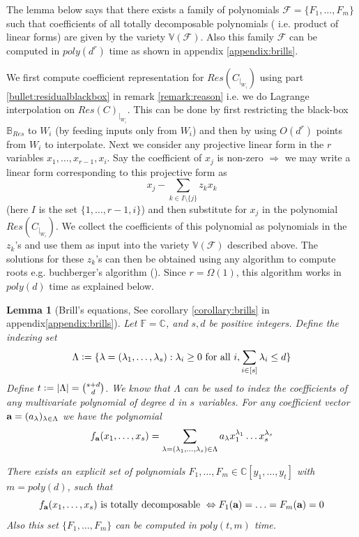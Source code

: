 \documentclass[12pt]{caltech_thesis}
\theoremstyle{plain}
\newtheorem{lemma}{Lemma}
\theoremstyle{definition}
\newcommand{\defeq}{\vcentcolon=}
\renewcommand{\bf}{\textbf}
\newcommand{\F}{\mathbb{F}}
\newcommand{\MF}{\mathcal{F}}
\newcommand{\CB}{\mathbb{B}}
\newcommand{\C}{\mathbb{C}}
\newcommand{\V}{\mathbb{V}}
\begin{document}
The lemma below says that
there exists a family of polynomials $\MF = \{F_1,\ldots,F_m\}$ such that coefficients of all totally decomposable polynomials 
( i.e. product of linear forms)
are given by the variety $\V(\MF)$. Also this family $\MF$ can be computed in $poly(d^r)$ time as shown in appendix \ref{appendix:brills}.

We first compute coefficient representation for $Res(C_{|_{W_i}})$ using part \ref{bullet:residualblackbox} in remark 
\ref{remark:reason} i.e. we do Lagrange interpolation on $Res(C)_{|_{W_i}}$. This can be done by first restricting
the black-box $\CB_{Res}$ to $W_i$ (by feeding inputs only from $W_i$) and then by using $O(d^r)$ points from $W_i$ to
interpolate. Next we consider any   projective linear form in the $r$ variables $x_1,\ldots,x_{r-1},x_i$. Say the coefficient of $x_j$
is non-zero $\Rightarrow$ we may write a linear form corresponding to this projective form  as 
\[x_j -\sum\limits_{k\in I\setminus \{j\}}z_kx_k\] (here $I$ is the set $\{1,\ldots,r-1,i\}$)
and then substitute for $x_j$ in the polynomial $Res(C_{|_{W_i}})$. We collect the coefficients of this polynomial 
as polynomials in the $z_k$'s and use them as input into the variety $\V(\MF)$ described above. The solutions for these
$z_k$'s can then be obtained using any algorithm to compute roots e.g. buchberger's algorithm (\cite{Buc76}). Since $r = \Omega(1)$,
this algorithm works in $poly(d)$ time as explained below.

\begin{lemma}[Brill's equations, See corollary \ref{corollary:brills} in appendix\ref{appendix:brills}]\label{lemma:brills}
 Let $\F=\C$, and $s,d$ be positive integers.
 Define the indexing set
\[
 \Lambda\defeq \{\lambda = (\lambda_1,\ldots,\lambda_s) : \lambda_i\geq 0 \text{ for all } i,
 \sum\limits_{i\in[s]}\lambda_i\leq d\}
 \]
 Define $ t \defeq |\Lambda| = {s+d\choose d}$. We know that $\Lambda$ can be used to index the coefficients of any multivariate polynomial of degree
 $d$ in $s$ variables. For any coefficient vector ${\bf a }= (a_\lambda)_{\lambda\in \Lambda}$ we have the polynomial
 \[
 f_{\bf a}(x_1,\ldots,x_s) = \sum\limits_{\lambda=(\lambda_1,\ldots,\lambda_s) \in \Lambda}a_{\lambda}x_1^{\lambda_1}\ldots x_s^{\lambda_s}
 \]

There exists an explicit set of polynomials $F_1,\ldots,F_m \in \C[y_1,\ldots,y_t]$ with $m=poly(d)$, such that
\[
f_{\bf a}(x_1,\ldots,x_s) \text{ is totally decomposable } \Leftrightarrow F_1(\bf a) = \ldots = F_m(\bf a)=0
\]
Also this set $\{F_1,\ldots,F_m\}$ can be computed in $poly(t,m)$ time.
\end{lemma}
\end{document}
